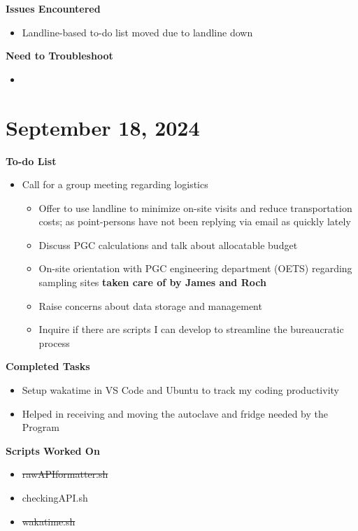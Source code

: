 \documentclass[11pt]{report}
\newcommand{\done}{\checkmark}
\newcommand{\moved}{\faArrowCircleRight}
\newcommand{\deprecated}[1]{\sout{#1}}
\begin{document}
{\textbf{Issues Encountered}
\begin{itemize}
	\item Landline-based to-do list moved due to landline down 
\end{itemize}

\textbf{Need to Troubleshoot}
\begin{itemize}
	\item 
\end{itemize}

\newpage


\section{September 18, 2024}

\textbf{To-do List}
\begin{itemize}
	\item [\moved] Call for a group meeting regarding logistics 
	
	\begin{itemize}
		\item [\done] Offer to use landline to minimize on-site visits and reduce transportation costs; as point-persons have not been replying via email as quickly lately
		\item [\done] Discuss PGC calculations and talk about allocatable budget
		\item [\done] On-site orientation with PGC engineering department (OETS) regarding sampling sites \textbf{taken care of by James and Roch}
		\item [\moved] Raise concerns about data storage and management
		\item [\moved] Inquire if there are scripts I can develop to streamline the bureaucratic process
	\end{itemize}
\end{itemize}

\textbf{Completed Tasks}
\begin{itemize}
	\item Setup wakatime in VS Code and Ubuntu to track my coding productivity
	\item Helped in receiving and moving the autoclave and fridge needed by the Program
	
\end{itemize}

\textbf{Scripts Worked On}
\begin{itemize}
	\item \deprecated{rawAPIformatter.sh}
	\item [\done] checkingAPI.sh
	\item \deprecated{wakatime.sh}
\end{itemize}


}
\end{document}
